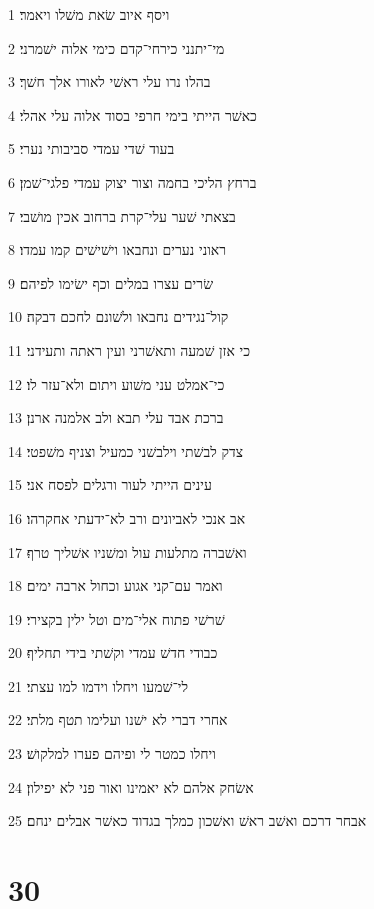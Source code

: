 \par 1 ויסף איוב שׂאת משׁלו ויאמר׃
\par 2 מי־יתנני כירחי־קדם כימי אלוה ישׁמרני׃
\par 3 בהלו נרו עלי ראשׁי לאורו אלך חשׁך׃
\par 4 כאשׁר הייתי בימי חרפי בסוד אלוה עלי אהלי׃
\par 5 בעוד שׁדי עמדי סביבותי נערי׃
\par 6 ברחץ הליכי בחמה וצור יצוק עמדי פלגי־שׁמן׃
\par 7 בצאתי שׁער עלי־קרת ברחוב אכין מושׁבי׃
\par 8 ראוני נערים ונחבאו וישׁישׁים קמו עמדו׃
\par 9 שׂרים עצרו במלים וכף ישׂימו לפיהם׃
\par 10 קול־נגידים נחבאו ולשׁונם לחכם דבקה׃
\par 11 כי אזן שׁמעה ותאשׁרני ועין ראתה ותעידני׃
\par 12 כי־אמלט עני משׁוע ויתום ולא־עזר לו׃
\par 13 ברכת אבד עלי תבא ולב אלמנה ארנן׃
\par 14 צדק לבשׁתי וילבשׁני כמעיל וצניף משׁפטי׃
\par 15 עינים הייתי לעור ורגלים לפסח אני׃
\par 16 אב אנכי לאביונים ורב לא־ידעתי אחקרהו׃
\par 17 ואשׁברה מתלעות עול ומשׁניו אשׁליך טרף׃
\par 18 ואמר עם־קני אגוע וכחול ארבה ימים׃
\par 19 שׁרשׁי פתוח אלי־מים וטל ילין בקצירי׃
\par 20 כבודי חדשׁ עמדי וקשׁתי בידי תחליף׃
\par 21 לי־שׁמעו ויחלו וידמו למו עצתי׃
\par 22 אחרי דברי לא ישׁנו ועלימו תטף מלתי׃
\par 23 ויחלו כמטר לי ופיהם פערו למלקושׁ׃
\par 24 אשׂחק אלהם לא יאמינו ואור פני לא יפילון׃
\par 25 אבחר דרכם ואשׁב ראשׁ ואשׁכון כמלך בגדוד כאשׁר אבלים ינחם׃

\chapter{30}

